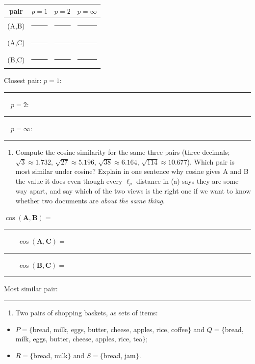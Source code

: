 \documentclass[
  11pt,
]{article}
\newcounter{none} %
\providecommand{\tightlist}{%
  \setlength{\itemsep}{0pt}\setlength{\parskip}{0pt}}
\newcommand{\answerspace}[1]{\par\vspace*{#1}}  %
\newcommand{\blank}[1][1.2in]{\rule{#1}{0.4pt}}
\begin{document}
{\def\LTcaptype{none} %
\begin{longtable}[]{@{}cccc@{}}
\toprule\noalign{}
pair & \(p=1\) & \(p=2\) & \(p=\infty\) \\
\midrule\noalign{}
\endhead
\bottomrule\noalign{}
\endlastfoot
(A,B) & \blank[0.8in] & \blank[0.8in] & \blank[0.8in] \\
(A,C) & \blank[0.8in] & \blank[0.8in] & \blank[0.8in] \\
(B,C) & \blank[0.8in] & \blank[0.8in] & \blank[0.8in] \\
\end{longtable}
}

Closest pair: \(p=1\): \blank[0.7in] \(\quad p=2\):
\blank[0.7in] \(\quad p=\infty\): \blank[0.7in]

\answerspace{2.2in}

\begin{enumerate}
\def\labelenumi{(\alph{enumi})}
\setcounter{enumi}{1}
\tightlist
\item
  Compute the cosine similarity for the same three pairs (three
  decimals; \(\sqrt{3}\approx1.732\), \(\sqrt{27}\approx5.196\),
  \(\sqrt{38}\approx6.164\), \(\sqrt{114}\approx10.677\)). Which pair is
  most similar under cosine? Explain in one sentence why cosine gives A
  and B the value it does even though every \(\ell_p\) distance in (a)
  says they are some way apart, and say which of the two views is the
  right one if we want to know whether two documents are \emph{about the
  same thing}.
\end{enumerate}

\(\cos(\mathbf{A},\mathbf{B}) =\)
\blank[0.8in] \(\qquad \cos(\mathbf{A},\mathbf{C}) =\)
\blank[0.8in] \(\qquad \cos(\mathbf{B},\mathbf{C}) =\) \blank[0.8in]

Most similar pair: \blank[0.8in]

\answerspace{2.4in}

\newpage %

\begin{enumerate}
\def\labelenumi{(\alph{enumi})}
\setcounter{enumi}{2}
\tightlist
\item
  Two pairs of shopping baskets, as sets of items:
\end{enumerate}

\begin{itemize}
\tightlist
\item
  \(P = \{\)bread, milk, eggs, butter, cheese, apples, rice,
  coffee\(\}\) and \(Q = \{\)bread, milk, eggs, butter, cheese, apples,
  rice, tea\(\}\);
\item
  \(R = \{\)bread, milk\(\}\) and \(S = \{\)bread, jam\(\}\).
\end{itemize}
\end{document}
